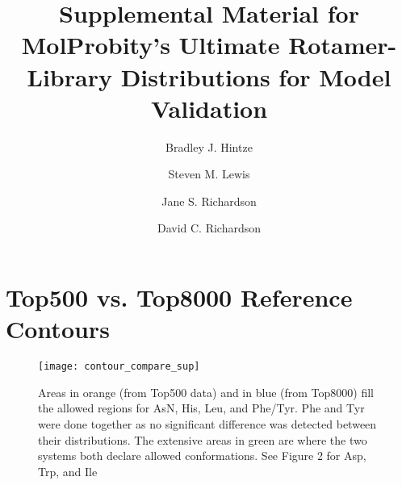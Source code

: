 \documentclass{article}
\begin{document}
\title{Supplemental Material for MolProbity's Ultimate Rotamer-Library Distributions for Model Validation}
\author{Bradley J. Hintze}
\author{Steven M. Lewis}
\author{Jane S. Richardson}
\author{David C. Richardson}
\date{}
\maketitle

\vspace{-15mm}
\tableofcontents
\listoffigures
\listoftables
\newpage


\newpage

\section{Top500 vs. Top8000 Reference Contours}
\begin{figure}[h]
  \centering
  \texttt{[image: contour\_compare\_sup]}
  \caption[Top500 vs Top8000 Contours for Residues with 2 $\chi$s ]
      {Areas in orange (from Top500 data) and in blue (from Top8000) fill
      the allowed regions for AsN, His, Leu, and Phe/Tyr. Phe and Tyr were done
      together as no significant difference was detected between their distributions.
      The extensive areas in green are where the two systems both declare allowed 
      conformations. See Figure 2 for Asp, Trp, and Ile}
    \label{fig:outcounts}
\end{figure}
\newpage


\newpage

\newpage

\newpage

\newpage
\end{document}
